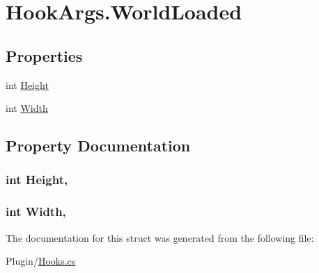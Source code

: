 \hypertarget{structOTA_1_1Plugin_1_1HookArgs_1_1WorldLoaded}{}\section{Hook\+Args.\+World\+Loaded}
\label{structOTA_1_1Plugin_1_1HookArgs_1_1WorldLoaded}
\subsection*{Properties}
\begin{DoxyCompactItemize}
\item 
int \hyperlink{structOTA_1_1Plugin_1_1HookArgs_1_1WorldLoaded_aaadefba794062a2ca7e58ceb10b955a1}{Height}
\item 
int \hyperlink{structOTA_1_1Plugin_1_1HookArgs_1_1WorldLoaded_abbe7749c3b402f7dfe64f936774cfcd4}{Width}
\end{DoxyCompactItemize}


\subsection{Property Documentation}
\hypertarget{structOTA_1_1Plugin_1_1HookArgs_1_1WorldLoaded_aaadefba794062a2ca7e58ceb10b955a1}{}
\subsubsection[{Height}]{\setlength{\rightskip}{0pt plus 5cm}int Height\hspace{0.3cm}{\ttfamily [get]}, {\ttfamily [set]}}\label{structOTA_1_1Plugin_1_1HookArgs_1_1WorldLoaded_aaadefba794062a2ca7e58ceb10b955a1}
\hypertarget{structOTA_1_1Plugin_1_1HookArgs_1_1WorldLoaded_abbe7749c3b402f7dfe64f936774cfcd4}{}
\subsubsection[{Width}]{\setlength{\rightskip}{0pt plus 5cm}int Width\hspace{0.3cm}{\ttfamily [get]}, {\ttfamily [set]}}\label{structOTA_1_1Plugin_1_1HookArgs_1_1WorldLoaded_abbe7749c3b402f7dfe64f936774cfcd4}


The documentation for this struct was generated from the following file\+:\begin{DoxyCompactItemize}
\item 
Plugin/\hyperlink{Hooks_8cs}{Hooks.\+cs}\end{DoxyCompactItemize}
